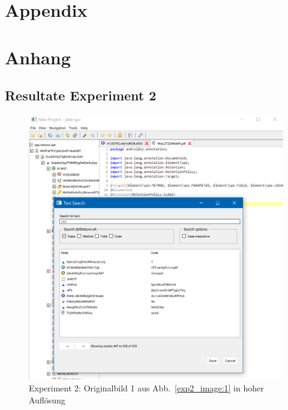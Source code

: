 
{\chapter{Appendix}}    %
{\chapter{Anhang}}      %
\label{chap:appendix}


\section{Resultate Experiment 2}
\label{sec:appendix:exp2}
\begin{figure} [ht]
  \centering
  \includegraphics[height=0.67\textheight]{bilder/result_exp2/0.png}

  \caption{Experiment 2: Originalbild 1 aus Abb.~\ref{exp2_image:1} in hoher Auflösung}
\end{figure}

